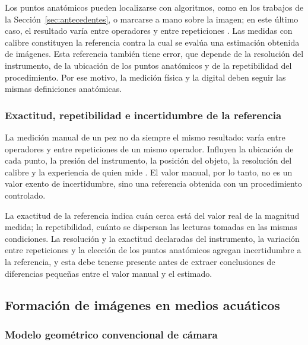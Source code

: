 Los puntos anatómicos pueden localizarse con algoritmos, como en los trabajos de la Sección~\ref{sec:antecedentes}, o marcarse a mano sobre la imagen; en este último caso, el resultado varía entre operadores y entre repeticiones \parencite{Petrtyl2014}. Las medidas con calibre constituyen la referencia contra la cual se evalúa una estimación obtenida de imágenes. Esta referencia también tiene error, que depende de la resolución del instrumento, de la ubicación de los puntos anatómicos y de la repetibilidad del procedimiento. Por ese motivo, la medición física y la digital deben seguir las mismas definiciones anatómicas.

\subsubsection{Exactitud, repetibilidad e incertidumbre de la referencia}

La medición manual de un pez no da siempre el mismo resultado: varía entre operadores y entre repeticiones de un mismo operador. Influyen la ubicación de cada punto, la presión del instrumento, la posición del objeto, la resolución del calibre y la experiencia de quien mide \parencite{Petrtyl2014}. El valor manual, por lo tanto, no es un valor exento de incertidumbre, sino una referencia obtenida con un procedimiento controlado.

La exactitud de la referencia indica cuán cerca está del valor real de la magnitud medida; la repetibilidad, cuánto se dispersan las lecturas tomadas en las mismas condiciones. La resolución y la exactitud declaradas del instrumento, la variación entre repeticiones y la elección de los puntos anatómicos agregan incertidumbre a la referencia, y esta debe tenerse presente antes de extraer conclusiones de diferencias pequeñas entre el valor manual y el estimado.

\subsection{Formación de imágenes en medios acuáticos}

\subsubsection{Modelo geométrico convencional de cámara}

